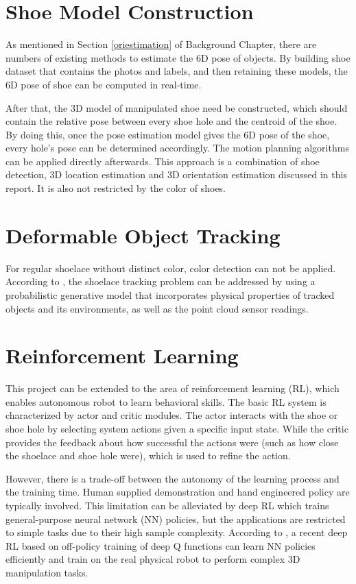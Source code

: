 \section{Shoe Model Construction}
As mentioned in Section \ref{oriestimation} of Background Chapter, there are numbers of existing methods to estimate the 6D pose of objects. By building shoe dataset that contains the photos and labels, and then retaining these models, the 6D pose of shoe can be computed in real-time. 

After that, the 3D model of manipulated shoe need be constructed, which should contain the relative pose between every shoe hole and the centroid of the shoe. By doing this, once the pose estimation model gives the 6D pose of the shoe, every hole's pose can be determined accordingly. The motion planning algorithms can be applied directly afterwards. This approach is a combination of shoe detection, 3D location estimation and 3D orientation estimation discussed in this report. It is also not restricted by the color of shoes.

\section{Deformable Object Tracking}
For regular shoelace without distinct color, color detection can not be applied. According to \citep{deformable_track}, the shoelace tracking problem can be addressed by using a probabilistic generative model that incorporates physical properties of tracked objects and its environments, as well as the point cloud sensor readings. 

\section{Reinforcement Learning}
This project can be extended to the area of reinforcement learning (RL), which enables autonomous robot to learn behavioral skills. The basic RL system is characterized by actor and critic modules. The actor interacts with the shoe or shoe hole by selecting system actions given a specific input state. While the critic provides the feedback about how successful the actions were (such as how close the shoelace and shoe hole were), which is used to refine the action.

However, there is a trade-off between the autonomy of the learning process and the training time. Human supplied demonstration and hand engineered policy are typically involved. This limitation can be alleviated by deep RL which trains general-purpose neural network (NN) policies, but the applications are restricted to simple tasks due to their high sample complexity. According to \citep{reinforcementl}, a recent deep RL based on off-policy training of deep Q functions can learn NN policies efficiently and train on the real physical robot to perform complex 3D manipulation tasks.